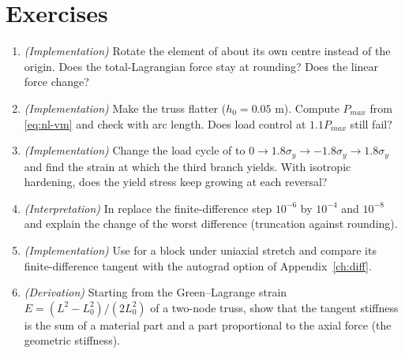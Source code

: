 \section*{Exercises}\label{sec:nl-exercises}
\begin{enumerate}
\item \emph{(Implementation)} Rotate the element of  about its own centre instead of the origin. Does the total-Lagrangian force stay at rounding? Does the linear force change?
\item \emph{(Implementation)} Make the truss flatter ($h_0=0.05$ m). Compute $P_{max}$ from \eqref{eq:nl-vm} and check with arc length. Does load control at $1.1P_{max}$ still fail?
\item \emph{(Implementation)} Change the load cycle of  to $0\to1.8\sigma_y\to-1.8\sigma_y\to1.8\sigma_y$ and find the strain at which the third branch yields. With isotropic hardening, does the yield stress keep growing at each reversal?
\item \emph{(Interpretation)} In  replace the finite-difference step $10^{-6}$ by $10^{-4}$ and $10^{-8}$ and explain the change of the worst difference (truncation against rounding).
\item \emph{(Implementation)} Use  for a block under uniaxial stretch and compare its finite-difference tangent with the autograd option of Appendix~\ref{ch:diff}.
\item \emph{(Derivation)} Starting from the Green--Lagrange strain $E=(L^2-L_0^2)/(2L_0^2)$ of a two-node truss, show that the tangent stiffness is the sum of a material part and a part proportional to the axial force (the geometric stiffness).
\end{enumerate}

\chapterrefs
